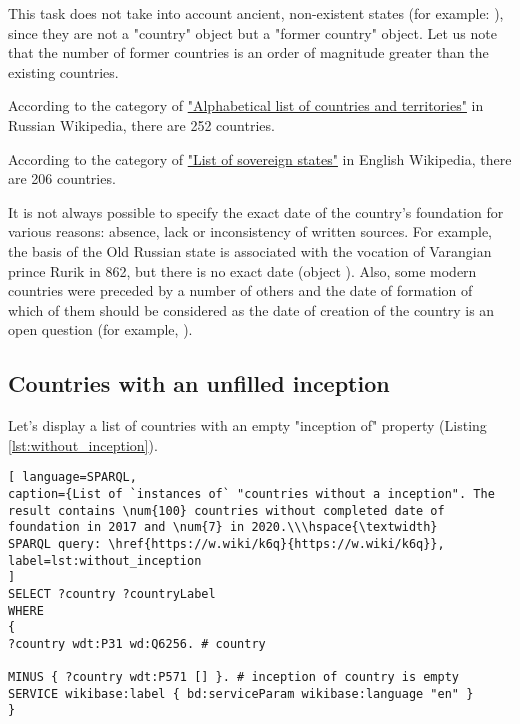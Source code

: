 This task does not take into account ancient, non-existent states (for example: ), since they are not a "country" object but a "former country" object. Let us note that the number of former countries is an order of magnitude greater than the existing countries.

According to the category of \href{https://w.wiki/dWv}{"Alphabetical list of countries and territories"} in Russian Wikipedia, there are 252 countries.

According to the category of \href{https://en.wikipedia.org/wiki/List_of_sovereign_states}{"List of sovereign states"} in English Wikipedia, there are 206 countries.

It is not always possible to specify the exact date of the country's foundation for various reasons: absence, lack or inconsistency of written sources. For example, the basis of the Old Russian state is associated with the vocation of Varangian prince Rurik in 862, but there is no exact date (object ). Also, some modern countries were preceded by a number of others and the date of formation of which of them should be considered as the date of creation of the country is an open question (for example, ).

\subsection{Countries with an unfilled inception}

Let's display a list of countries with an empty "inception of" property (Listing \ref{lst:without_inception}).

\begin{lstlisting}[ language=SPARQL, 
caption={List of `instances of` "countries without a inception". The result contains \num{100} countries without completed date of foundation in 2017 and \num{7} in 2020.\\\hspace{\textwidth}
SPARQL query: \href{https://w.wiki/k6q}{https://w.wiki/k6q}},
label=lst:without_inception
]
SELECT ?country ?countryLabel 
WHERE
{
?country wdt:P31 wd:Q6256. # country

MINUS { ?country wdt:P571 [] }. # inception of country is empty
SERVICE wikibase:label { bd:serviceParam wikibase:language "en" }
}
\end{lstlisting}


